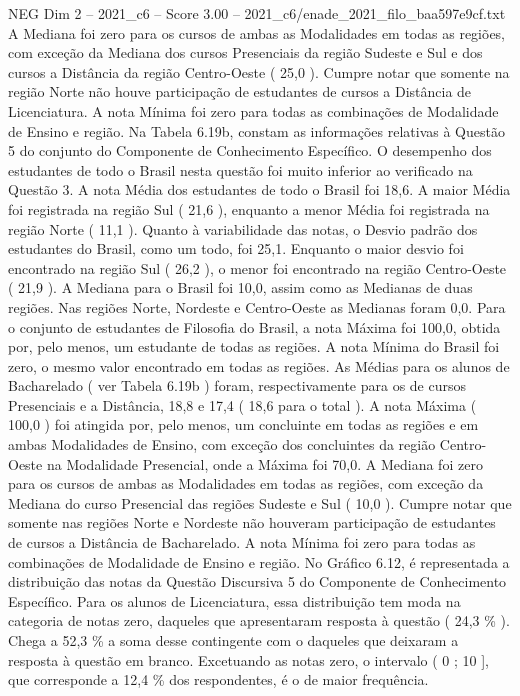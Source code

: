 \begin{textsample}{NEG Dim 2 – 2021\_c6 – Score 3.00 – 2021\_c6/enade\_2021\_filo\_baa597e9cf.txt}
A Mediana foi zero para os cursos de ambas as Modalidades em todas as regiões, com exceção da Mediana dos cursos Presenciais da região Sudeste e Sul e dos cursos a Distância da região Centro-Oeste ( 25,0 ).
Cumpre notar que somente na região Norte não houve participação de estudantes de cursos a Distância de Licenciatura.
A nota Mínima foi zero para todas as combinações de Modalidade de Ensino e região.
Na Tabela 6.19b, constam as informações relativas à Questão 5 do conjunto do Componente de Conhecimento Específico.
O desempenho dos estudantes de todo o Brasil nesta questão foi muito inferior ao verificado na Questão 3.
A nota Média dos estudantes de todo o Brasil foi 18,6.
A maior Média foi registrada na região Sul ( 21,6 ), enquanto a menor Média foi registrada na região Norte ( 11,1 ).
Quanto à variabilidade das notas, o Desvio padrão dos estudantes do Brasil, como um todo, foi 25,1.
Enquanto o maior desvio foi encontrado na região Sul ( 26,2 ), o menor foi encontrado na região Centro-Oeste ( 21,9 ).
A Mediana para o Brasil foi 10,0, assim como as Medianas de duas regiões.
Nas regiões Norte, Nordeste e Centro-Oeste as Medianas foram 0,0.
Para o conjunto de estudantes de Filosofia do Brasil, a nota Máxima foi 100,0, obtida por, pelo menos, um estudante de todas as regiões.
A nota Mínima do Brasil foi zero, o mesmo valor encontrado em todas as regiões.
As Médias para os alunos de Bacharelado ( ver Tabela 6.19b ) foram, respectivamente para os de cursos Presenciais e a Distância, 18,8 e 17,4 ( 18,6 para o total ).
A nota Máxima ( 100,0 ) foi atingida por, pelo menos, um concluinte em todas as regiões e em ambas Modalidades de Ensino, com exceção dos concluintes da região Centro-Oeste na Modalidade Presencial, onde a Máxima foi 70,0.
A Mediana foi zero para os cursos de ambas as Modalidades em todas as regiões, com exceção da Mediana do curso Presencial das regiões Sudeste e Sul ( 10,0 ).
Cumpre notar que somente nas regiões Norte e Nordeste não houveram participação de estudantes de cursos a Distância de Bacharelado.
A nota Mínima foi zero para todas as combinações de Modalidade de Ensino e região.
No Gráfico 6.12, é representada a distribuição das notas da Questão Discursiva 5 do Componente de Conhecimento Específico.
Para os alunos de Licenciatura, essa distribuição tem moda na categoria de notas zero, daqueles que apresentaram resposta à questão ( 24,3 \% ).
Chega a 52,3 \% a soma desse contingente com o daqueles que deixaram a resposta à questão em branco.
Excetuando as notas zero, o intervalo ( 0 ; 10 ], que corresponde a 12,4 \% dos respondentes, é o de maior frequência.

\end{textsample}
